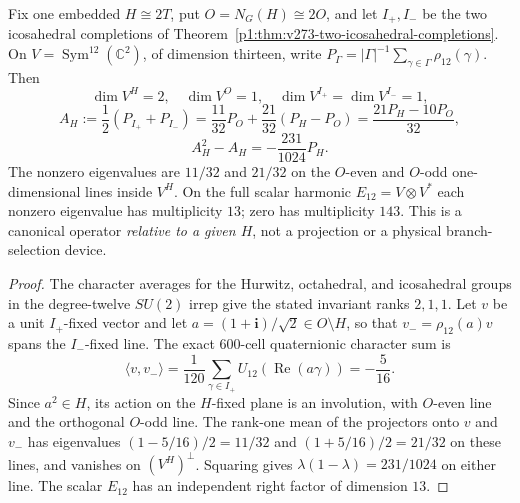 \documentclass[11pt,a4paper]{article}
\begin{document}
\begin{theorem}
\label{p2f:thm:v273-twin-projector-spectral-identity}
Fix one embedded $H\cong2T$, put $O=N_G(H)\cong2O$, and let
$I_+,I_-$ be the two icosahedral completions of
Theorem~\ref{p1:thm:v273-two-icosahedral-completions}.
On $V=\operatorname{Sym}^{12}(\mathbb C^2)$, of dimension thirteen,
write $P_\Gamma=|\Gamma|^{-1}\sum_{\gamma\in\Gamma}\rho_{12}(\gamma)$.
Then
\[
 \dim V^H=2,\quad\dim V^O=1,\quad \dim V^{I_+}=\dim V^{I_-}=1,
\]
\[
 \boxed{A_H:=\frac12(P_{I_+}+P_{I_-})
 =\frac{11}{32}P_O+\frac{21}{32}(P_H-P_O)
 =\frac{21P_H-10P_O}{32},}
\]
\[
 \boxed{A_H^2-A_H=-\frac{231}{1024}P_H.}
\]
The nonzero eigenvalues are $11/32$ and $21/32$ on the
$O$-even and $O$-odd one-dimensional lines inside $V^H$.
On the full scalar harmonic $E_{12}=V\otimes V^*$ each nonzero
eigenvalue has multiplicity $13$; zero has multiplicity $143$.
This is a canonical operator \emph{relative to a given $H$},
not a projection or a physical branch-selection device.
\end{theorem}
\begin{proof}
The character averages for the Hurwitz, octahedral, and icosahedral
groups in the degree-twelve $SU(2)$ irrep give the stated invariant
ranks $2,1,1$. Let $v$ be a unit $I_+$-fixed vector and let
$a=(1+\mathbf i)/\sqrt2\in O\setminus H$, so that
$v_-=\rho_{12}(a)v$ spans the $I_-$-fixed line.
The exact 600-cell quaternionic character sum is
\[
 \langle v,v_-\rangle=
 \frac1{120}\sum_{\gamma\in I_+}
 U_{12}(\operatorname{Re}(a\gamma))=-\frac5{16}.
\]
Since $a^2\in H$, its action on the $H$-fixed plane is an
involution, with $O$-even line and the orthogonal $O$-odd line.
The rank-one mean of the projectors onto $v$ and $v_-$ has eigenvalues
$(1-5/16)/2=11/32$ and $(1+5/16)/2=21/32$ on these lines, and
vanishes on $(V^H)^\perp$.
Squaring gives $\lambda(1-\lambda)=231/1024$ on either line.
The scalar $E_{12}$ has an independent right factor of dimension $13$.
\end{proof}
\end{document}
